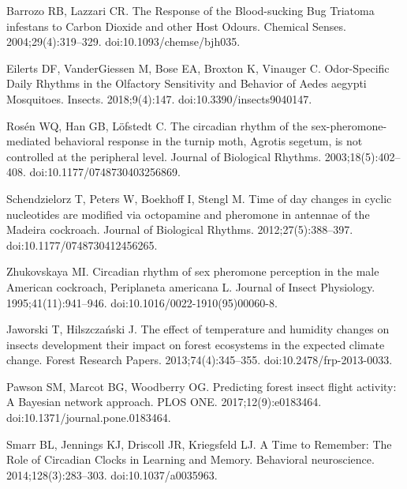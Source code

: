 \documentclass[12pt]{article}
\begin{document}
\begin{thebibliography}{10}
	Barrozo RB, Lazzari CR.
	\newblock The {Response} of the {Blood}-sucking {Bug} {Triatoma} infestans to
	{Carbon} {Dioxide} and other {Host} {Odours}.
	\newblock Chemical Senses. 2004;29(4):319--329.
	\newblock doi:{10.1093/chemse/bjh035}.
	
	Eilerts DF, VanderGiessen M, Bose EA, Broxton K, Vinauger C.
	\newblock Odor-{Specific} {Daily} {Rhythms} in the {Olfactory} {Sensitivity}
	and {Behavior} of {Aedes} aegypti {Mosquitoes}.
	\newblock Insects. 2018;9(4):147.
	\newblock doi:{10.3390/insects9040147}.
	
	Rosén WQ, Han GB, Löfstedt C.
	\newblock The circadian rhythm of the sex-pheromone-mediated behavioral
	response in the turnip moth, {Agrotis} segetum, is not controlled at the
	peripheral level.
	\newblock Journal of Biological Rhythms. 2003;18(5):402--408.
	\newblock doi:{10.1177/0748730403256869}.
	
	Schendzielorz T, Peters W, Boekhoff I, Stengl M.
	\newblock Time of day changes in cyclic nucleotides are modified via octopamine
	and pheromone in antennae of the {Madeira} cockroach.
	\newblock Journal of Biological Rhythms. 2012;27(5):388--397.
	\newblock doi:{10.1177/0748730412456265}.
	
	Zhukovskaya MI.
	\newblock Circadian rhythm of sex pheromone perception in the male {American}
	cockroach, {Periplaneta} americana {L}.
	\newblock Journal of Insect Physiology. 1995;41(11):941--946.
	\newblock doi:{10.1016/0022-1910(95)00060-8}.
	
	Jaworski T, Hilszczański J.
	\newblock The effect of temperature and humidity changes on insects development
	their impact on forest ecosystems in the expected climate change.
	\newblock Forest Research Papers. 2013;74(4):345--355.
	\newblock doi:{10.2478/frp-2013-0033}.
	
	Pawson SM, Marcot BG, Woodberry OG.
	\newblock Predicting forest insect flight activity: {A} {Bayesian} network
	approach.
	\newblock PLOS ONE. 2017;12(9):e0183464.
	\newblock doi:{10.1371/journal.pone.0183464}.
	
	Smarr BL, Jennings KJ, Driscoll JR, Kriegsfeld LJ.
	\newblock A {Time} to {Remember}: {The} {Role} of {Circadian} {Clocks} in
	{Learning} and {Memory}.
	\newblock Behavioral neuroscience. 2014;128(3):283--303.
	\newblock doi:{10.1037/a0035963}.
	

\end{thebibliography}
\end{document}

